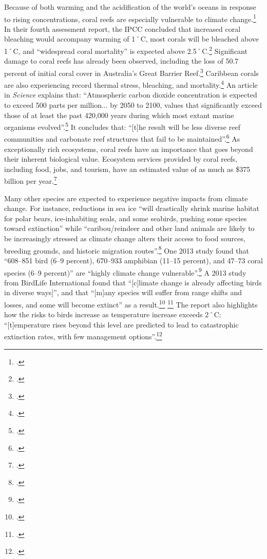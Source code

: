 Because of both warming and the acidification of the world's oceans in response to rising  concentrations, coral reefs are especially vulnerable to climate change.\footcite[][]{CoralReefs2013}
In their fourth assessment report, the IPCC concluded that increased coral bleaching would accompany warming of 1˚C, most corals will be bleached above 1˚C, and ``widespread coral mortality'' is expected above 2.5˚C.\footcite[][p.51]{IPCCar4_syr}
Significant damage to coral reefs has already been observed, including the loss of 50.7 percent of initial coral cover in Australia's Great Barrier Reef.\footcite[][]{27declinecoral}
Caribbean corals are also experiencing record thermal stress, bleaching, and mortality.\footcite[][]{CaribbeanCorals}
An article in \emph{Science} explains that: ``Atmospheric carbon dioxide concentration is expected to exceed 500 parts per million... by 2050 to 2100, values that significantly exceed those of at least the past 420,000 years during which most extant marine organisms evolved''.\footcite[][p. 1737--1742]{CoralRapidCC}
It concludes that: ``[t]he result will be less diverse reef communities and carbonate reef structures that fail to be maintained''.\footcite[][p. 1737--1742]{CoralRapidCC}
As exceptionally rich ecosystems, coral reefs have an importance that goes beyond their inherent biological value.
Ecosystem services provided by coral reefs, including food, jobs, and tourism, have an estimated value of as much as \$375 billion per year.\footcite[][]{NOAACoral}



Many other species are expected to experience negative impacts from climate change.
For instance, reductions in sea ice ``will drastically shrink marine habitat for polar bears, ice-inhabiting seals, and some seabirds, pushing some species toward extinction'' while ``caribou/reindeer and other land animals are likely to be increasingly stressed as climate change alters their access to food sources, breeding grounds, and historic migration routes''.\footcite[][Executive summary, p. 10]{ACIA2004}
One 2013 study found that ``608–851 bird (6–9 percent), 670–933 amphibian (11–15 percent), and 47–73 coral species (6–9 percent)'' are ``highly climate change vulnerable''.\footcite[][p. 1]{VulnerableSpecies}
A 2013 study from BirdLife International found that ``[c]limate change is already affecting birds in diverse ways]'', and that ``[m]any species will suffer from range shifts and losses, and some will become extinct'' as a result.\footcite[][p. 15]{StateWorldBirds} \footcite[See also: ][]{CBCBirdLife}
The report also highlights how the risks to birds increase as temperature increase exceeds 2˚C: ``[t]emperature rises beyond this level are predicted to lead to catastrophic extinction rates, with few management options''.\footcite[][]{BirdLifeCC}



